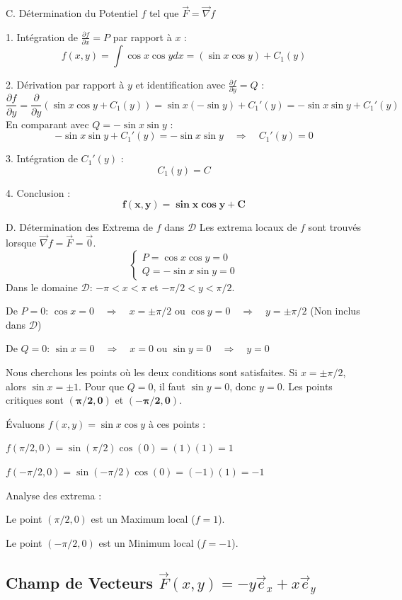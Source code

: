 \documentclass[french]{yLectureNote}
\renewcommand{\vec}{\overrightarrow}
\begin{document}
C. Détermination du Potentiel $f$ tel que $\vec{F} = \vec{\nabla}f$

1.  Intégration de $\frac{\partial f}{\partial x} = P$ par rapport à $x$ :
    $$
    f(x,y) = \int \cos x \cos y dx = (\sin x \cos y) + C_1(y)
    $$

2.  Dérivation par rapport à $y$ et identification avec $\frac{\partial f}{\partial y} = Q$ :
    $$
    \frac{\partial f}{\partial y} = \frac{\partial}{\partial y}(\sin x \cos y + C_1(y)) = \sin x (-\sin y) + C_1'(y) = -\sin x \sin y + C_1'(y)
    $$
    En comparant avec $Q = -\sin x \sin y$ :
    $$
    -\sin x \sin y + C_1'(y) = -\sin x \sin y \quad \Rightarrow \quad C_1'(y) = 0
    $$

3.  Intégration de $C_1'(y)$ :
    $$
    C_1(y) = C
    $$

4.  Conclusion :
    $$
    \mathbf{f(x,y) = \sin x \cos y + C}
    $$

D. Détermination des Extrema de $f$ dans $\mathcal{D}$
Les extrema locaux de $f$ sont trouvés lorsque $\vec{\nabla}f = \vec{F} = \vec{0}$.
$$
\begin{cases}
P = \cos x \cos y = 0 \\
Q = -\sin x \sin y = 0
\end{cases}
$$
Dans le domaine $\mathcal{D}$: $-\pi < x < \pi$ et $-\pi/2 < y < \pi/2$.

De $P=0$:
$\cos x = 0 \quad \Rightarrow \quad x = \pm \pi/2$
ou
$\cos y = 0 \quad \Rightarrow \quad y = \pm \pi/2$ (Non inclus dans $\mathcal{D}$)

De $Q=0$:
$\sin x = 0 \quad \Rightarrow \quad x = 0$
ou
$\sin y = 0 \quad \Rightarrow \quad y = 0$

Nous cherchons les points où les deux conditions sont satisfaites.
Si $x = \pm \pi/2$, alors $\sin x = \pm 1$. Pour que $Q=0$, il faut $\sin y = 0$, donc $y=0$.
    Les points critiques sont $\mathbf{( \pi/2, 0 )}$ et $\mathbf{( -\pi/2, 0 )}$.

Évaluons $f(x,y) = \sin x \cos y$ à ces points :

$f(\pi/2, 0) = \sin(\pi/2)\cos(0) = (1)(1) = 1$

$f(-\pi/2, 0) = \sin(-\pi/2)\cos(0) = (-1)(1) = -1$

Analyse des extrema :

Le point $(\pi/2, 0)$ est un Maximum local ($f=1$).

Le point $(-\pi/2, 0)$ est un Minimum local ($f=-1$).


\subsection{Champ de Vecteurs $\vec{F}(x,y)=-y\vec{e}_{x}+x\vec{e}_{y}$}
\end{document}
